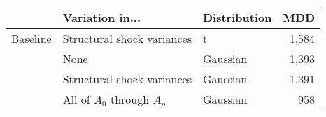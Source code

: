 \begingroup
\fontsize{12.0pt}{14.4pt}\selectfont
\begin{tabular}{lllr}
\toprule
  & Variation in... & Distribution & MDD \\ 
\midrule\addlinespace[2.5pt]
Baseline & Structural shock variances & t & 1,584 \\ 
 & None & Gaussian & 1,393 \\ 
 & Structural shock variances & Gaussian & 1,391 \\ 
 & All of \(A_0\) through \(A_p\) & Gaussian & 958 \\ 
\bottomrule
\end{tabular}
\endgroup

